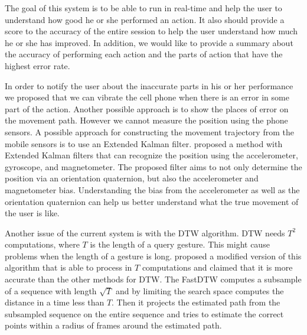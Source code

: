 The goal of this system is to be able to run in real-time and help the user to understand how good he or she performed an action. It also should provide a score to the accuracy of the entire session to help the user understand how much he or she has improved. In addition, we would like to provide a summary about the accuracy of performing each action and the parts of action that have the highest error rate.

In order to notify the user about the inaccurate parts in his or her performance we proposed that we can vibrate the cell phone when there is an error in some part of the action. Another possible approach is to show the places of error on the movement path. However we cannot measure the position using the phone sensors. A possible approach for constructing the movement trajectory from the mobile sensors is to use an Extended Kalman filter. \cite{sabatini2006quaternion} proposed a method with Extended Kalman filters that can recognize the position using the accelerometer, gyroscope, and magnetometer. The proposed filter aims to not only determine the position via an orientation quaternion, but also the accelerometer and magnetometer bias. Understanding the bias from the accelerometer as well as the orientation quaternion can help us better understand what the true movement of the user is like.

Another issue of the current system is with the DTW algorithm. DTW needs $T^2$ computations, where $T$ is the length of a query gesture. This might cause problems when the length of a gesture is long. \cite{salvador2007toward} proposed a modified version of this algorithm that is able to process in $T$ computations and claimed that it is more accurate than the other methods for DTW. The FastDTW computes a subsample of a sequence with length $\sqrt{T}$ and by limiting the search space computes the distance in a time less than $T$. Then it projects the estimated path from the subsampled sequence on the entire sequence and tries to estimate the correct points within a radius of frames around the estimated path.


